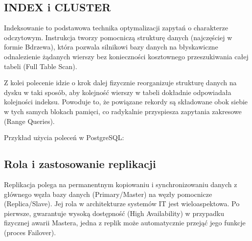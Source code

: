\documentclass[letterpaper,10pt,polish]{sphinxmanual}
\begin{document}
\subsection{INDEX i CLUSTER}
\label{\detokenize{rozdzia_u0142_2/rozdzia_u0142_25/index:index-i-cluster}}
\sphinxAtStartPar
Indeksowanie to podstawowa technika optymalizacji zapytań o charakterze odczytowym. Instrukcja  tworzy pomocniczą strukturę danych (najczęściej w formie B\sphinxhyphen{}drzewa), która pozwala silnikowi bazy danych na błyskawiczne odnalezienie żądanych wierszy bez konieczności kosztownego przeszukiwania całej tabeli (Full Table Scan).

\sphinxAtStartPar
Z kolei polecenie  idzie o krok dalej \textendash{} fizycznie reorganizuje strukturę danych na dysku w taki sposób, aby kolejność wierszy w tabeli dokładnie odpowiadała kolejności indeksu. Powoduje to, że powiązane rekordy są składowane obok siebie w tych samych blokach pamięci, co radykalnie przyspiesza zapytania zakresowe (Range Queries).

\sphinxAtStartPar
Przykład użycia poleceń w PostgreSQL:

\begin{sphinxVerbatim}[commandchars=\\\{\}]

\end{sphinxVerbatim}


\subsection{Rola i zastosowanie replikacji}
\label{\detokenize{rozdzia_u0142_2/rozdzia_u0142_25/index:rola-i-zastosowanie-replikacji}}
\sphinxAtStartPar
Replikacja polega na permanentnym kopiowaniu i synchronizowaniu danych z głównego węzła bazy danych (Primary/Master) na węzły pomocnicze (Replica/Slave). Jej rola w architekturze systemów IT jest wieloaspektowa. Po pierwsze, gwarantuje wysoką dostępność (High Availability) \textendash{} w przypadku fizycznej awarii Mastera, jedna z replik może automatycznie przejąć jego funkcje (proces Failover).
\end{document}
